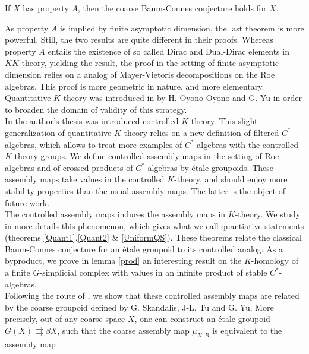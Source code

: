 \begin{thm}[G. Yu \cite{Yu2}]
If $X$ has property $A$, then the coarse Baum-Connes conjecture holds for $X$.
\end{thm}

As property $A$ is implied by finite asymptotic dimension, the last theorem is more powerful. Still, the two results are quite different in their proofs. Whereas property $A$ entails the existence of so called Dirac and Dual-Dirac elements in $KK$-theory, yielding the result, the proof in the setting of finite asymptotic dimension relies on a analog of Mayer-Vietoris decompositions on the Roe algebras. This proof is more geometric in nature, and more elementary. Quantitative $K$-theory was introduced in \cite{OY2} by H. Oyono-Oyono and G. Yu in order to broaden the domain of validity of this strategy.\\ 

In the author's thesis was introduced controlled $K$-theory. This slight generalization of quantitative $K$-theory relies on a new definition of filtered $C^*$-algebras, which allows to treat more examples of $C^*$-algebras with the controlled $K$-theory groups. We define controlled assembly maps in the setting of Roe algebras and of crossed products of $C^*$-algebras by étale groupoids. These assembly maps take values in the controlled $K$-theory, and should enjoy more stability properties than the usual assembly maps. The latter is the object of future work. \\

The controlled assembly maps induces the assembly maps in $K$-theory. We study in more details this phenomenon, which gives what we call quantiative statements (theorems \ref{Quant1},\ref{Quant2} \& \ref{UniformQS}). These theorems relate the classical Baum-Connes conjecture for an étale groupoid to its controlled analog. As a byproduct, we prove in lemma \ref{prod} an interesting result on the $K$-homology of a finite $G$-simplicial complex with values in an infinite product of stable $C^*$-algebras.\\

Following the route of \cite{SkTuYu}, we show that these controlled assembly maps are related by the coarse groupoid defined by G. Skandalis, J-L. Tu and G. Yu. More precisely, out of any coarse space $X$, one can construct an étale groupoid $G(X) \rightrightarrows \beta X$, such that the coarse assembly map $\mu_{X,B}$ is equivalent to the assembly map

